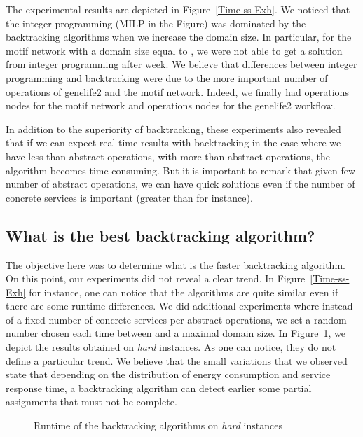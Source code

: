 \documentclass[a4paper]{article}
\begin{document}
The experimental results are depicted in Figure~\ref{Time-ss-Exh}. 
We noticed that the integer programming (MILP in the Figure) was dominated by the backtracking 
algorithms when we increase the domain size. In particular, for the motif network with a domain 
size equal to , we were not able to get a solution from integer programming after  week. 
We believe that differences between integer programming and backtracking were due to the 
more important number of operations of genelife2 and the motif network. Indeed, we finally had 
  operations nodes for the motif network and  operations nodes for the genelife2 workflow. 

In addition to the superiority of backtracking, these experiments also revealed that if 
we can expect real-time results with backtracking in the case where we have less than  
abstract operations, with more than  abstract operations, the algorithm becomes time 
consuming. But it is important to remark that given few number of abstract operations, we 
can have quick solutions even if the number of concrete services is important (greater than  
for instance). 

\subsection{What is the best backtracking algorithm?}

The objective here was to determine what is the faster backtracking algorithm. 
On this point, our experiments did not reveal a clear trend. In Figure~\ref{Time-ss-Exh} 
for instance, one can notice that the algorithms are quite similar even if there are some runtime 
differences. We did additional experiments where instead of a fixed number of concrete services 
per abstract operations, we set a random number chosen each time between  and a maximal 
domain size. In Figure~\ref{Time-ss-b}, we depict the results obtained on {\it hard }
instances. As one can notice, they do not define a particular trend. We believe that the small variations 
that we observed state that depending on the distribution of energy consumption and service response time, 
a backtracking algorithm can detect earlier some partial assignments that must not be complete. 


\begin{figure}[ht]
\centering
{}

\caption{Runtime of the backtracking algorithms on {\it hard} instances}
\label{Time-ss-b}
\end{figure}
\end{document}
